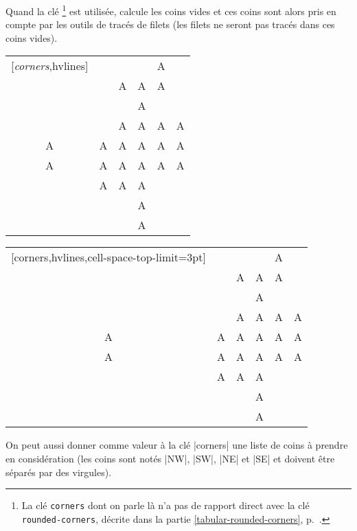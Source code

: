 \documentclass[dvipsnames]{article}%
\begin{document}
\medskip
Quand la clé \footnote{La clé \texttt{corners} dont on parle
  là n'a pas de rapport direct avec la clé \texttt{rounded-corners}, décrite
  dans la partie \ref{tabular-rounded-corners},
  p.~\pageref{tabular-rounded-corners}.} est utilisée,  calcule
les coins vides et ces coins sont alors pris en compte par les outils de tracés
de filets (les filets ne seront pas tracés dans ces coins vides).

\medskip
\begin{Code}[width=11cm]
\begin{NiceTabular}{*{6}{c}}[\emph{corners},hvlines]
  &   &   &   & A \\
  &   & A & A & A \\
  &   &   & A \\
  &   & A & A & A & A \\
A & A & A & A & A & A \\
A & A & A & A & A & A \\
  & A & A & A \\
  &  & & A \\
  &   &   & A \\
\end{NiceTabular}
\end{Code}
\begin{NiceTabular}{*{6}{c}}[corners,hvlines,cell-space-top-limit=3pt]
  &   &   &   & A \\
  &   & A & A & A \\
  &   &   & A \\
  &   & A & A & A & A \\
A & A & A & A & A & A \\
A & A & A & A & A & A \\
  & A & A & A \\
  &  & & A \\
  &   &   & A \\
\end{NiceTabular}

\vspace{1cm}
On peut aussi donner comme valeur à la clé |corners| une liste de coins à
prendre en considération (les coins sont notés |NW|, |SW|, |NE| et |SE| et
doivent être séparés par des virgules).
\end{document}
